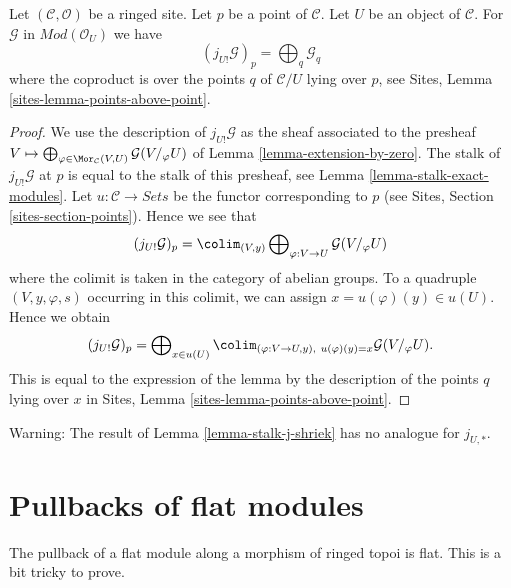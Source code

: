 \begin{lemma}
\label{lemma-stalk-j-shriek}
Let $(\mathcal{C}, \mathcal{O})$ be a ringed site.
Let $p$ be a point of $\mathcal{C}$. Let $U$ be an object of $\mathcal{C}$.
For $\mathcal{G}$ in $\textit{Mod}(\mathcal{O}_U)$ we have
$$
(j_{U!}\mathcal{G})_p =
\bigoplus\nolimits_q \mathcal{G}_q
$$
where the coproduct is over the points $q$ of $\mathcal{C}/U$
lying over $p$, see
Sites, Lemma \ref{sites-lemma-points-above-point}.
\end{lemma}

\begin{proof}
We use the description of $j_{U!}\mathcal{G}$ as the sheaf associated
to the presheaf
$V \mapsto
\bigoplus\nolimits_{\varphi \in \Mor_\mathcal{C}(V, U)}
\mathcal{G}(V/_\varphi U)$
of
Lemma \ref{lemma-extension-by-zero}.
The stalk of $j_{U!}\mathcal{G}$ at $p$ is equal to the
stalk of this presheaf, see
Lemma \ref{lemma-stalk-exact-modules}.
Let $u : \mathcal{C} \to \textit{Sets}$ be the functor corresponding
to $p$ (see Sites, Section \ref{sites-section-points}).
Hence we see that
$$
(j_{U!}\mathcal{G})_p = \colim_{(V, y)}
\bigoplus\nolimits_{\varphi : V \to U} \mathcal{G}(V/_\varphi U)
$$
where the colimit is taken in the category of abelian groups.
To a quadruple $(V, y, \varphi, s)$ occurring in this colimit, we can assign
$x = u(\varphi)(y) \in u(U)$. Hence we obtain
$$
(j_{U!}\mathcal{G})_p =
\bigoplus\nolimits_{x \in u(U)}
\colim_{(\varphi : V \to U, y), \ u(\varphi)(y) = x} \mathcal{G}(V/_\varphi U).
$$
This is equal to the expression of the lemma by the description
of the points $q$ lying over $x$ in
Sites, Lemma \ref{sites-lemma-points-above-point}.
\end{proof}

\begin{remark}
\label{remark-not-pushforward}
Warning: The result of
Lemma \ref{lemma-stalk-j-shriek}
has no analogue for $j_{U, *}$.
\end{remark}












\section{Pullbacks of flat modules}
\label{section-pullback-flat}

\noindent
The pullback of a flat module along a morphism of ringed topoi is flat.
This is a bit tricky to prove.

